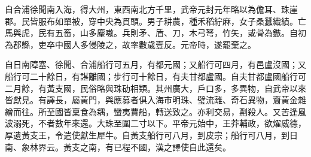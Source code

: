 \begin{pinyinscope}
自合浦徐聞南入海，得大州，東西南北方千里，武帝元封元年略以為儋耳、珠崖郡。民皆服布如單被，穿中央為貫頭。男子耕農，種禾稻紵麻，女子桑蠶織績。亡馬與虎，民有五畜，山多麈嗷。兵則矛、盾、刀，木弓弩，竹矢，或骨為鏃。自初為郡縣，吏卒中國人多侵陵之，故率數歲壹反。元帝時，遂罷棄之。

自日南障塞、徐聞、合浦船行可五月，有都元國；又船行可四月，有邑盧沒國；又船行可二十餘日，有諶離國；步行可十餘日，有夫甘都盧國。自夫甘都盧國船行可二月餘，有黃支國，民俗略與珠劯相類。其州廣大，戶口多，多異物，自武帝以來皆獻見。有譯長，屬黃門，與應募者俱入海巿明珠、璧流離、奇石異物，齎黃金雜繒而往。所至國皆稟食為耦，蠻夷賈船，轉送致之。亦利交易，剽殺人。又苦逢風波溺死，不者數年來還。大珠至圍二寸以下。平帝元始中，王莽輔政，欲燿威德，厚遺黃支王，令遣使獻生犀牛。自黃支船行可八月，到皮宗；船行可八月，到日南、象林界云。黃支之南，有已程不國，漢之譯使自此還矣。


\end{pinyinscope}